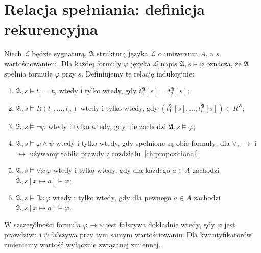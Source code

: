 \section{Relacja spełniania: definicja rekurencyjna}
\begin{definicja}\label{def:sem-satisfaction}
Niech $\mathcal L$ będzie sygnaturą, $\mathfrak A$ strukturą
języka $\mathcal L$ o uniwersum $A$, a $s$ wartościowaniem.
Dla każdej formuły $\varphi$ języka $\mathcal L$ napis
$\mathfrak A,s\models\varphi$ oznacza, że $\mathfrak A$ spełnia
formułę $\varphi$ przy $s$. Definiujemy tę relację indukcyjnie:
\begin{enumerate}[label=(\roman*)]
\item $\mathfrak A,s\models t_1=t_2$ wtedy i tylko wtedy, gdy
      $t_1^{\mathfrak A}[s]=t_2^{\mathfrak A}[s]$;
\item $\mathfrak A,s\models R(t_1,\ldots,t_n)$ wtedy i tylko wtedy, gdy
      $(t_1^{\mathfrak A}[s],\ldots,t_n^{\mathfrak A}[s])\in R^{\mathfrak A}$;
\item $\mathfrak A,s\models\neg\varphi$ wtedy i tylko wtedy, gdy
      nie zachodzi $\mathfrak A,s\models\varphi$;
\item $\mathfrak A,s\models\varphi\land\psi$ wtedy i tylko wtedy,
      gdy spełnione są obie formuły; dla $\lor$, $\to$ i $\leftrightarrow$
      używamy tablic prawdy z rozdziału~\ref{ch:propositional};
\item $\mathfrak A,s\models\forall x\,\varphi$ wtedy i tylko wtedy,
      gdy dla każdego $a\in A$ zachodzi
      $\mathfrak A,s[x\mapsto a]\models\varphi$;
\item $\mathfrak A,s\models\exists x\,\varphi$ wtedy i tylko wtedy,
      gdy dla pewnego $a\in A$ zachodzi
      $\mathfrak A,s[x\mapsto a]\models\varphi$.
\end{enumerate}
\end{definicja}
W szczególności formuła $\varphi\to\psi$ jest fałszywa dokładnie wtedy,
gdy $\varphi$ jest prawdziwa i $\psi$ fałszywa przy tym samym wartościowaniu.
Dla kwantyfikatorów zmieniamy wartość wyłącznie związanej zmiennej.

